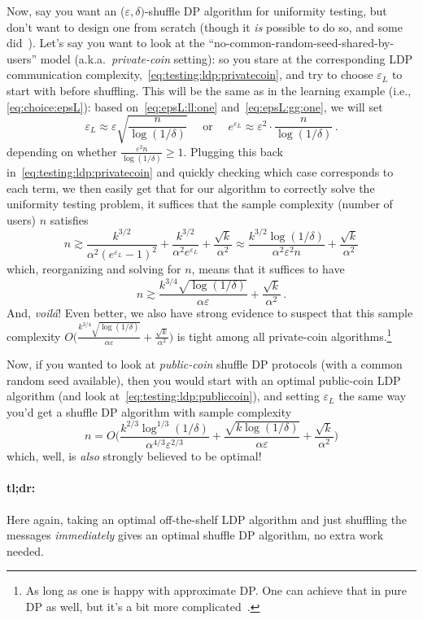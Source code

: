 \documentclass[11pt]{article}
\begin{document}
\begin{description}
Now, say you want an ($\varepsilon,\delta)$-shuffle DP algorithm for uniformity testing, but don't want to design one from scratch (though it \emph{is} possible to do so, and some did~\cite{BalcerCJM21,CanonneL22,CheuY21}). Let's say you want to look at the ``no-common-random-seed-shared-by-users'' model (a.k.a.\ \emph{private-coin} setting): so you stare at the corresponding LDP communication complexity,~\eqref{eq:testing:ldp:privatecoin}, and try to choose $\varepsilon_L$ to start with before shuffling. This will be the same as in the learning example (i.e., \eqref{eq:choice:epsL}): based on~\eqref{eq:epsL:ll:one} and~\eqref{eq:epsL:gg:one}, we will set
\begin{equation}
	 \varepsilon_{L} \approx \varepsilon \sqrt{\frac{n}{\log(1/\delta)}}  \quad\text{ or }\quad e^{\varepsilon_{L}} \approx \varepsilon^2 \cdot \frac{n}{\log(1/\delta)}\,.
\end{equation}
depending on whether $\frac{\varepsilon^2 n}{\log(1/\delta)}\geq 1$. Plugging this back in~\eqref{eq:testing:ldp:privatecoin} and quickly checking which case corresponds to each term, we then easily get that for our algorithm to correctly solve the uniformity testing problem, it suffices that the sample complexity (number of users) $n$ satisfies
\[
	n \gtrsim \frac{k^{3/2}}{\alpha^2(e^{\varepsilon_L}-1)^2} + \frac{k^{3/2}}{\alpha^2e^{\varepsilon_L}} + \frac{\sqrt{k}}{\alpha^2}
	 \approx \frac{k^{3/2}\log(1/\delta)}{\alpha^2\varepsilon^2 n } + \frac{\sqrt{k}}{\alpha^2}
\]
which, reorganizing and solving for $n$, means that it suffices to have 
\[
	n \gtrsim \frac{k^{3/4}\sqrt{\log(1/\delta)}}{\alpha\varepsilon} + \frac{\sqrt{k}}{\alpha^2}\,.
\]
And, \emph{voil\'a}! Even better, we also have strong evidence to suspect that this sample complexity $O\Big(\frac{k^{3/4}\sqrt{\log(1/\delta)}}{\alpha\varepsilon}+ \frac{\sqrt{k}}{\alpha^2}\Big)$ is tight among all private-coin algorithms.\footnote{As long as one is happy with approximate DP. One can achieve that in pure DP as well, but it's a bit more complicated~\cite{CheuY21}.}

Now, if you wanted to look at \emph{public-coin} shuffle DP protocols (with a common random seed available), then you would start with an optimal public-coin LDP algorithm (and look at~\eqref{eq:testing:ldp:publiccoin}), and setting $\varepsilon_L$ the same way you'd get a shuffle DP algorithm with sample complexity
\[
n=O\Big(\frac{k^{2/3}\log^{1/3}(1/\delta)}{\alpha^{4/3}\varepsilon^{2/3}} + \frac{\sqrt{k\log(1/\delta)}}{\alpha\varepsilon}+ \frac{\sqrt{k}}{\alpha^2}\Big)
\]
which, well, is \emph{also} strongly believed to be optimal!

\paragraph{tl;dr:} Here again, taking an optimal off-the-shelf LDP algorithm and just shuffling the messages \emph{immediately} gives an optimal shuffle DP algorithm, no extra work needed.
\end{description}
\end{document}
